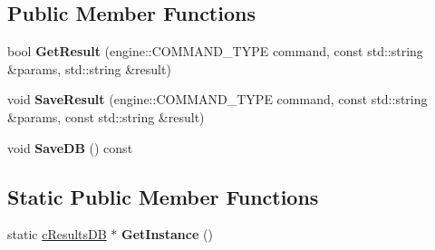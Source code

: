 \subsection*{Public Member Functions}
\begin{DoxyCompactItemize}
\item 
\hypertarget{classresultsDB_1_1cResultsDB_a02d8a22f9d7aea2ee62385decb6e9c9e}{bool {\bfseries Get\-Result} (engine\-::\-C\-O\-M\-M\-A\-N\-D\-\_\-\-T\-Y\-P\-E command, const std\-::string \&params, std\-::string \&result)}\label{classresultsDB_1_1cResultsDB_a02d8a22f9d7aea2ee62385decb6e9c9e}

\item 
\hypertarget{classresultsDB_1_1cResultsDB_a9e27cf265d98568c31252b6164e5f0e5}{void {\bfseries Save\-Result} (engine\-::\-C\-O\-M\-M\-A\-N\-D\-\_\-\-T\-Y\-P\-E command, const std\-::string \&params, const std\-::string \&result)}\label{classresultsDB_1_1cResultsDB_a9e27cf265d98568c31252b6164e5f0e5}

\item 
\hypertarget{classresultsDB_1_1cResultsDB_a559abd644f2f1e2df8909bcf16fd2d07}{void {\bfseries Save\-D\-B} () const }\label{classresultsDB_1_1cResultsDB_a559abd644f2f1e2df8909bcf16fd2d07}

\end{DoxyCompactItemize}
\subsection*{Static Public Member Functions}
\begin{DoxyCompactItemize}
\item 
\hypertarget{classresultsDB_1_1cResultsDB_a8f6921a15fc1e574f8a356352824a0e5}{static \hyperlink{classresultsDB_1_1cResultsDB}{c\-Results\-D\-B} $\ast$ {\bfseries Get\-Instance} ()}\label{classresultsDB_1_1cResultsDB_a8f6921a15fc1e574f8a356352824a0e5}

\end{DoxyCompactItemize}

